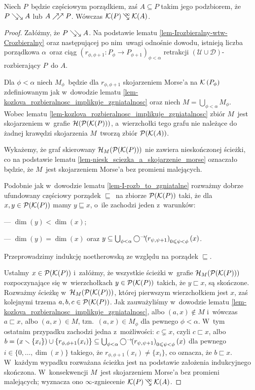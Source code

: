 \begin{stw}\label{stw-rozb_posetow_implikuje_collapsibility_kompleksow}
Niech $P$~będzie częściowym porządkiem, zaś $A\subseteq P$ takim jego podzbiorem, że $P\searrow\!\!\searrow A$ lub $A\nearrow\!\!\nearrow P$. Wówczas $\mK(P)\infcoll \mK(A)$.
\end{stw}
\begin{proof}
Załóżmy, że $P\searrow\!\!\searrow A$. Na podstawie lematu \ref{lem-Irozbieralny-wtw-Crozbieralny} oraz następującej po nim~uwagi odnośnie dowodu, istnieją liczba porządkowa $\alpha$~oraz ciąg $\left(r_{\phi,\phi+1}\colon P_\phi\to P_{\phi+1}\right)_{\phi<\alpha}$ retrakcji $(\mathcal{U}\cup \mathcal{D})$-rozbierający $P$~do $A$. 

Dla $\phi<\alpha$ niech $M_\phi$~będzie dla $r_{\phi,\phi+1}$ skojarzeniem Morse'a na $\mathcal{K}\left(P_\phi\right)$ zdefiniowanym jak w~dowodzie lematu \ref{lem-kozlova_rozbieralnosc_implikuje_zgniatalnosc} oraz niech $M=\bigcup_{\phi<\alpha}M_\phi$. Wobec lematu \ref{lem-kozlova_rozbieralnosc_implikuje_zgniatalnosc} zbiór $M$~jest skojarzeniem w~grafie $\mathcal{H}(\mathcal{P}(\mathcal{K}(P)))$, a~wierzchołki tego grafu nie należące do żadnej krawędzi skojarzenia $M$~tworzą zbiór $\mathcal{P}(\mathcal{K}(A))$. 

Wykażemy, że graf skierowany $\mathcal{H}_M(\mathcal{P}(\mathcal{K}(P)))$ nie zawiera nieskończonej ścieżki, co na podstawie lematu \ref{lem-niesk_sciezka_a_skojarzenie_morse} oznaczało będzie, że $M$~jest skojarzeniem Morse'a bez promieni malejących.

Podobnie jak w~dowodzie lematu \ref{lem-I-rozb_to_zgniatalne} rozważmy dobrze ufundowany częściowy porządek $\sqsubseteq$~na zbiorze $\mathcal{P}(\mathcal{K}(P))$ taki, że dla $x,y\in\mathcal{P}(\mathcal{K}(P))$ mamy $y\sqsubseteq x$, o~ile zachodzi jeden z~warunków:
\begin{compactitem}
\item[---] $\dim(y)<\dim(x)$;
\item[---] $\dim(y)=\dim(x)$ oraz $y\subseteq \bigcup_{\phi<\alpha} \bigcirc^\rightarrow\!\! \left(r_{\psi,\psi+1}\right)_{0\leqslant \psi<\phi}(x)$.
\end{compactitem} 
Przeprowadzimy indukcję noetherowską ze względu na porządek $\sqsubseteq$.

Ustalmy $x\in \mathcal{P}(\mathcal{K}(P))$ i~załóżmy, że wszystkie ścieżki w~grafie $\mathcal{H}_M(\mathcal{P}(\mathcal{K}(P)))$ rozpoczynające się w~wierzchołkach $y\in \mathcal{P}(\mathcal{K}(P))$ takich, że $y\sqsubset x$, są skończone. Rozważmy ścieżkę w~$\mathcal{H}_M(\mathcal{P}(\mathcal{K}(P)))$, której pierwszym wierzchołkiem jest $x$, zaś kolejnymi trzema $a,b,c\in\mathcal{P}(\mathcal{K}(P))$. Jak zauważyliśmy w~dowodzie lematu \ref{lem-kozlova_rozbieralnosc_implikuje_zgniatalnosc}, albo $(a,x)\not\in M$ i~wówczas $a\sqsubset x$, albo $(a,x)\in M$, tzn.~$(a,x)\in M_\phi$ dla pewnego $\phi<\alpha$. W~tym ostatnim przypadku zachodzi jedna z~możliwości: $c\subsetneq x$, czyli $c\sqsubset x$, albo $b=(x\smallsetminus\{x_i\})\cup \left\{r_{\phi,\phi+1}(x_i)\right\}\subseteq \bigcup_{\phi<\alpha} \bigcirc^\rightarrow\!\! \left(r_{\psi,\psi+1}\right)_{0\leqslant \psi<\phi}(x)$ dla pewnego $i\in\{0,\ldots,\dim(x)\}$ takiego, że $r_{\phi,\phi+1}(x_i)\not=\{x_i\}$, co oznacza, że $b\sqsubset x$. W~każdym wypadku rozważana ścieżka jest na podstawie założenia indukcyjnego skończona. W~konsekwencji $M$~jest skojarzeniem Morse'a bez promieni malejących; wyznacza ono $\infty$-zgniecenie $\mK(P)\infcoll \mK(A)$.


\end{proof}
